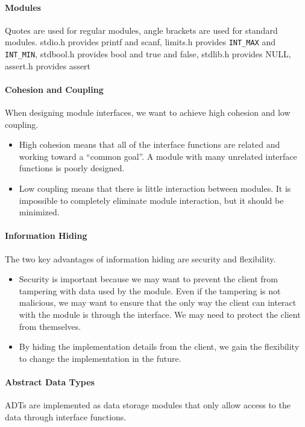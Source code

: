 \documentclass[10pt,letter]{article}
\begin{document}
\paragraph{Modules} Quotes are used for regular modules, angle brackets are used for standard modules. stdio.h provides printf and scanf, limits.h provides \verb|INT_MAX| and \verb|INT_MIN|, stdbool.h provides bool and true and false, stdlib.h provides NULL, assert.h provides assert

\paragraph{Cohesion and Coupling} When designing module interfaces, we want to achieve high cohesion and low coupling.
\begin{itemize}
    \item High cohesion means that all of the interface functions are related
and working toward a “common goal”. A module with many
unrelated interface functions is poorly designed.
\item Low coupling means that there is little interaction between
modules. It is impossible to completely eliminate module interaction,
but it should be minimized.
\end{itemize}

\paragraph{Information Hiding} The two key advantages of information hiding are security and
flexibility.
\begin{itemize}
    \item Security is important because we may want to prevent the client
from tampering with data used by the module. Even if the tampering
is not malicious, we may want to ensure that the only way the client
can interact with the module is through the interface. We may need
to protect the client from themselves.
\item By hiding the implementation details from the client, we gain the
flexibility to change the implementation in the future.
\end{itemize}

\paragraph{Abstract Data Types} ADTs are implemented as data storage modules that only allow access to the data through interface functions. 
\end{document}
